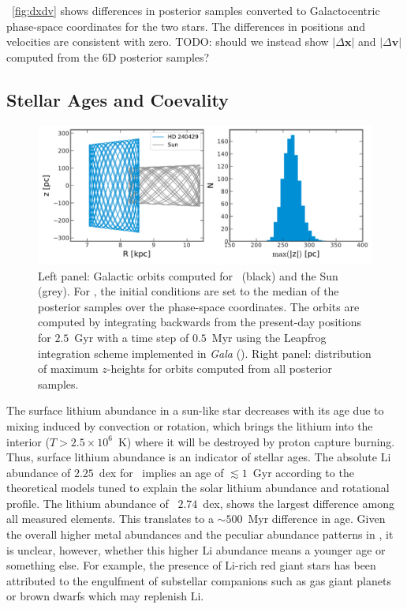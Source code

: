 \documentclass[12pt,letterpaper,margin=1in]{article}
\newcommand{\project}[1]{\textsl{#1}}
\newcommand*\elem[1]{\ensuremath{\mathrm{#1}}}
\newcommand{\sunanalog}{\text{Krios}}
\newcommand{\bizarreone}{\text{Kronos}}
\newcommand{\todo}[1]{{TODO: #1}}
\begin{document}
\figurename~\ref{fig:dxdv} shows differences in posterior samples converted to
Galactocentric phase-space coordinates for the two stars.
The differences in positions and velocities are consistent with zero.
\todo{should we instead show $|\Delta\boldsymbol{x}|$ and
$|\Delta\boldsymbol{v}|$ computed from the 6D posterior samples?}

\subsection{Stellar Ages and Coevality}

\begin{figure}[htbp]
  \begin{center}
    \includegraphics[width=\linewidth]{orbits.pdf}
  \end{center}
  \caption{Left panel: Galactic orbits computed for \sunanalog\ (black) and the
    Sun (grey).
    For \sunanalog, the initial conditions are set to the median of the
    posterior samples over the phase-space coordinates.
    The orbits are computed by integrating backwards from the present-day
    positions for $2.5$~Gyr with a time step of $0.5$~Myr using the Leapfrog
    integration scheme implemented in \project{Gala} (\citealt{gala}).
    Right panel: distribution of maximum $z$-heights for orbits computed from
    all posterior samples.
  }
  \label{fig:orbit}
\end{figure}


The surface lithium abundance in a sun-like star decreases with its age due to
mixing induced by convection or rotation, which brings the lithium into the
interior ($T>2.5 \times 10^{6}$~K) where it will be destroyed by proton capture
burning.
Thus, surface lithium abundance is an indicator of stellar ages.
The absolute $\elem{Li}$ abundance of $2.25$~dex for \sunanalog\ implies an age
of $\lesssim 1$~Gyr according to the theoretical models tuned to explain the
solar lithium abundance and rotational profile\cite{2005Sci...309.2189C}.
The lithium abundance of \bizarreone\, $2.74$~dex, shows the largest difference
among all measured elements.
This translates to a $\sim 500$~Myr difference in age.
Given the overall higher metal abundances and the peculiar abundance patterns
in \bizarreone, it is unclear, however, whether this higher $\elem{Li}$
abundance means a younger age or something else.
For example, the presence of $\elem{Li}$-rich red giant stars has been
attributed to the engulfment of substellar companions such as gas giant planets
or brown dwarfs which may replenish $\elem{Li}$\cite{Casey:2016aa}.
\end{document}
